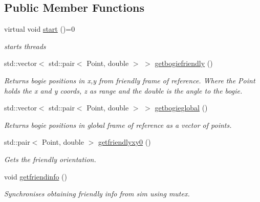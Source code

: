 \subsection*{Public Member Functions}
\begin{DoxyCompactItemize}
\item 
\mbox{\label{classBogieposInterface_a2a1a87b14e16f622d5acb694c9b9fcc0}} 
virtual void \hyperlink{classBogieposInterface_a2a1a87b14e16f622d5acb694c9b9fcc0}{start} ()=0
\begin{DoxyCompactList}\small\item\em starts threads \end{DoxyCompactList}\item 
std\+::vector$<$ std\+::pair$<$ Point, double $>$ $>$ \hyperlink{classBogieposInterface_aed3b03940731c8235e29795bdc493bbd}{getbogiefriendly} ()
\begin{DoxyCompactList}\small\item\em Returns bogie positions in x,y from friendly frame of reference. Where the Point holds the x and y coords, z as range and the double is the angle to the bogie. \end{DoxyCompactList}\item 
std\+::vector$<$ std\+::pair$<$ Point, double $>$ $>$ \hyperlink{classBogieposInterface_a0b8ba02bf6deb7b647f075e838bbbca9}{getbogieglobal} ()
\begin{DoxyCompactList}\small\item\em Returns bogie positions in global frame of reference as a vector of points. \end{DoxyCompactList}\item 
std\+::pair$<$ Point, double $>$ \hyperlink{classBogieposInterface_a730cb8dcbd3c42a19b6f6350ec1e3999}{getfriendlyxy0} ()
\begin{DoxyCompactList}\small\item\em Gets the friendly orientation. \end{DoxyCompactList}\item 
\mbox{\label{classBogieposInterface_af3e26b24f89b107056e086ed0bc5e1c1}} 
void \hyperlink{classBogieposInterface_af3e26b24f89b107056e086ed0bc5e1c1}{getfriendinfo} ()
\begin{DoxyCompactList}\small\item\em Synchronises obtaining friendly info from sim using mutex. \end{DoxyCompactList}\item 

\end{DoxyCompactItemize}
